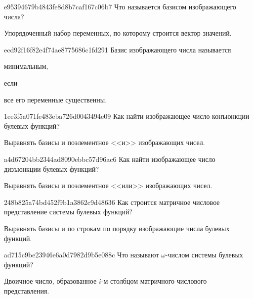 \begin{note}{e95394679b4843fe8d8b7caf167c06b7}
    Что называется базисом изображающего числа?

    \begin{cloze}{1}
        Упорядоченный набор переменных, по которому строится вектор значений.
    \end{cloze}
\end{note}

\begin{note}{ecd92f16f82e4f74ae8775686c1fd291}
    Базис изображающего числа называется \begin{icloze}{2}минимальным,\end{icloze} если \begin{icloze}{1}все его переменные существенны.\end{icloze}
\end{note}

\begin{note}{1ee3f5a071fe483eba726d0043494e09}
    Как найти изображающее число конъюнкции булевых функций?

    \begin{cloze}{1}
        Выравнять базисы и поэлементное <<и>> изображающих чисел.
    \end{cloze}
\end{note}

\begin{note}{a4d67204bb2344ad8090ebbc57d96ac6}
    Как найти изображающее число дизъюнкции булевых функций?

    \begin{cloze}{1}
        Выравнять базисы и поэлементное <<или>> изображающих чисел.
    \end{cloze}
\end{note}

\begin{note}{248b825a74bd452f9b1a3862c9d48636}
    Как строится матричное числовое представление системы булевых функций?

    \begin{cloze}{1}
        Выравнять базисы и по строкам по порядку изображающие числа булевых функций.
    \end{cloze}
\end{note}

\begin{note}{ad715c9be23946e6a0d7982d9b5e088c}
    Что называют \({ \omega }\)-числом системы булевых функций?

    \begin{cloze}{1}
        Двоичное число, образованное \({ i }\)-м столбцом матричного числового представления.
    \end{cloze}
\end{note}

